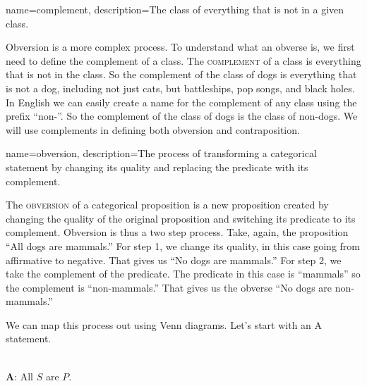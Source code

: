 {
name=complement,
description={The class of everything that is not in a given class.}
}


Obversion is a more complex process. To understand what an obverse is, we first need to define the complement of a class. The \textsc{\gls{complement}} \label{def:Complement} of a class is everything that is not in the class. So the complement of the class of dogs is everything that is not a dog, including not just cats, but battleships, pop songs, and black holes. In English we can easily create a name for the complement of any class using the prefix ``non-''. So the complement of the class of dogs is the class of non-dogs. We will use complements in defining both obversion and contraposition. 

{
name=obversion,
description={The process of transforming a categorical statement by changing its quality and replacing the predicate with its complement.}
}


The \textsc{\gls{obversion}} \label{def:Obversion} of a categorical proposition is a new proposition created by changing the quality of the original proposition and switching its predicate to its complement. Obversion is thus a two step process. Take, again, the proposition ``All dogs are mammals.'' For step 1, we change its quality, in this case going from affirmative to negative. That gives us ``No dogs are mammals.'' For step 2, we take the complement of the predicate. The predicate in this case is ``mammals'' so the complement is ``non-mammals.'' That gives us the obverse ``No dogs are non-mammals.''

We can map this process out using Venn diagrams. Let's start with an A statement.

\begin{center}
 \\
\textbf{A}: All $S$ are $P$.
\end{center}

